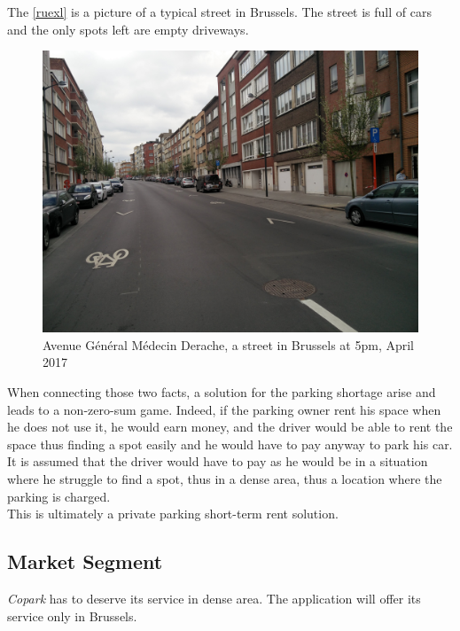 \documentclass[12pt,a4paper,oneside]{book}
\newcommand{\bp}{\textit{Copark}}
\begin{document}
The \autoref{ruexl} is a picture of a typical street in Brussels. The street is full of cars and the only spots left are empty driveways.

\begin{figure}[h]
\centering
\caption{Avenue Général Médecin Derache, a street in Brussels at 5pm, April 2017}
\label{ruexl}
\includegraphics[keepaspectratio=true,width=\textwidth-2cm]{../images/ruexl.jpg}
\end{figure}



When connecting those two facts, a solution for the parking shortage arise and leads to a non-zero-sum game. Indeed, if the parking owner rent his space when he does not use it, he would earn money, and the driver would be able to rent the space thus finding a spot easily and he would have to pay anyway to park his car. It is assumed that the driver would have to pay as he would be in a situation where he struggle to find a spot, thus in a dense area, thus a location where the parking is charged.\\

This is ultimately a private parking short-term rent solution.

\subsection{Market Segment}
\bp{} has to deserve its service in dense area. The application will offer its service only in Brussels.\\
\end{document}
